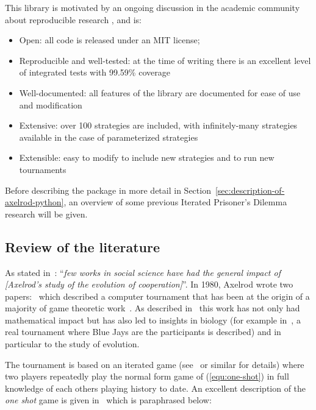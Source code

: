 \documentclass{article}
\begin{document}
This library is motivated by an ongoing discussion in the academic community
about reproducible research \cite{Crick2014a, Hong2015a, Prlic2012, Sandve2013},
and is:

\begin{itemize}
    \item Open: all code is released under an MIT license;
    \item Reproducible and well-tested: at the time of writing there is an excellent level of
        integrated tests with 99.59\% coverage
    \item Well-documented: all features of the library are documented for ease of
        use and modification
    \item Extensive: over 100 strategies are included, with infinitely-many
    strategies available in the case of parameterized strategies
    \item Extensible: easy to modify to include new strategies and to run new tournaments
\end{itemize}

Before describing the package in more detail in
Section~\ref{sec:description-of-axelrod-python}, an overview of some previous
Iterated Prisoner's Dilemma research will be given.

\subsection{Review of the literature}\label{sec:review}

As stated in~\cite{Bendor1991}: ``\textit{few works in social science have had
the general impact of [Axelrod's study of the evolution of cooperation]}''.  In
1980, Axelrod wrote two papers:~\cite{Axelrod1980a,Axelrod1980b} which
described a computer tournament that has been at the origin of a majority of
game theoretic work~\cite{Banks1990, Bendor1991, Boyd1987, Chellapilla1999,
DavidB1993, Doebeli2005, Ellison1994, Gotts2003, Hilbe2013, Isaac2008,
Kraines1989, Lee2015, Lorberbaum1994, Milgrom1982, Molander1985, Murnighan2015,
Press2012, Stephens2002, Stewart2012}. As described in~\cite{Bendor1991} this
work has not only had mathematical impact but has also led to insights in
biology (for example in~\cite{Stephens2002}, a real tournament where Blue Jays
are the participants is described) and in particular to the study of evolution.

The tournament is based on an iterated game (see~\cite{Maschler2013} or similar
for details) where two players repeatedly play the normal form game of
(\ref{equ:one-shot}) in full knowledge of each others playing history to date.
An excellent description of the \textit{one shot} game is given
in~\cite{Gotts2003} which is paraphrased below:
\end{document}
